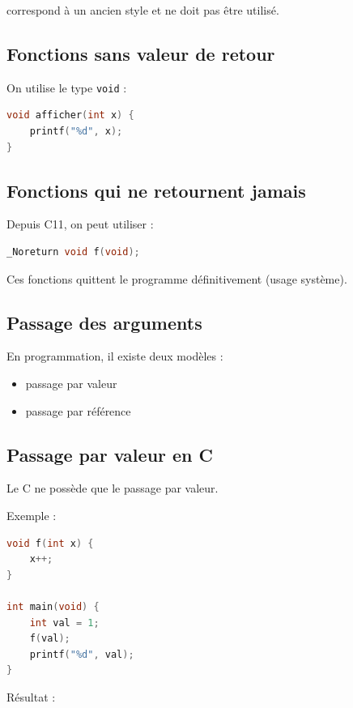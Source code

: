 correspond à un ancien style et ne doit pas être utilisé.

\subsection{Fonctions sans valeur de retour}

On utilise le type \texttt{void} :

\begin{lstlisting}[language=C]
void afficher(int x) {
    printf("%d", x);
}
\end{lstlisting}

\subsection{Fonctions qui ne retournent jamais}

Depuis C11, on peut utiliser :

\begin{lstlisting}[language=C]
_Noreturn void f(void);
\end{lstlisting}

Ces fonctions quittent le programme définitivement (usage système).

\subsection{Passage des arguments}

En programmation, il existe deux modèles :

\begin{itemize}
    \item passage par valeur
    \item passage par référence
\end{itemize}

\subsection{Passage par valeur en C}

Le C ne possède que le passage par valeur.

Exemple :

\begin{lstlisting}[language=C]
void f(int x) {
    x++;
}

int main(void) {
    int val = 1;
    f(val);
    printf("%d", val);
}
\end{lstlisting}

Résultat :

